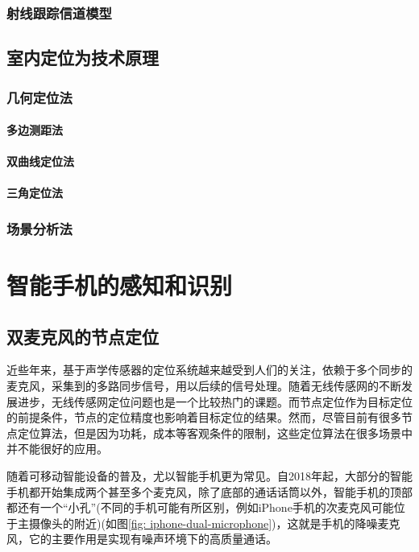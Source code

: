 \documentclass[winfonts]{njuthesis}
\begin{document}
		
		
		\subsection{射线跟踪信道模型}
	
	\section{室内定位为技术原理}
		\subsection{几何定位法}
			\subsubsection{多边测距法}
			
			
			\subsubsection{双曲线定位法}
			
			
			
			\subsubsection{三角定位法}
		\subsection{场景分析法}

\chapter{智能手机的感知和识别}\label{chapter_mobile}
	\section{双麦克风的节点定位}
		
		近些年来，基于声学传感器的定位系统越来越受到人们的关注，依赖于多个同步的麦克风，采集到的多路同步信号，用以后续的信号处理。随着无线传感网的不断发展进步，无线传感网定位问题也是一个比较热门的课题。而节点定位作为目标定位的前提条件，节点的定位精度也影响着目标定位的结果。然而，尽管目前有很多节点定位算法，但是因为功耗，成本等客观条件的限制，这些定位算法在很多场景中并不能很好的应用。
		
		随着可移动智能设备的普及，尤以智能手机更为常见。自2018年起，大部分的智能手机都开始集成两个甚至多个麦克风，除了底部的通话话筒以外，智能手机的顶部都还有一个“小孔”(不同的手机可能有所区别，例如iPhone手机的次麦克风可能位于主摄像头的附近)(如图\ref{fig: iphone-dual-microphone})，这就是手机的降噪麦克风，它的主要作用是实现有噪声环境下的高质量通话。
		
\end{document}
